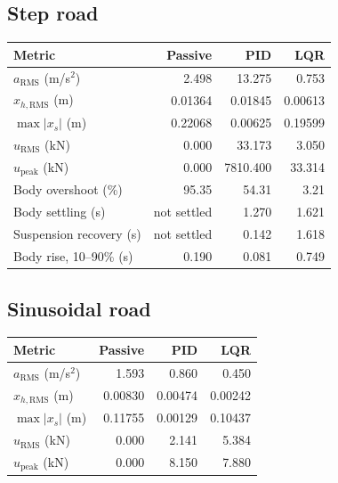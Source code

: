 \subsection*{Step road}
\begin{center}\begin{tabular}{lrrr}\toprule
Metric & Passive & PID & LQR\\\midrule
$a_{\mathrm{RMS}}$ (m/s$^2$) & 2.498 & 13.275 & 0.753\\
$x_{h,\mathrm{RMS}}$ (m) & 0.01364 & 0.01845 & 0.00613\\
$\max|x_s|$ (m) & 0.22068 & 0.00625 & 0.19599\\
$u_{\mathrm{RMS}}$ (kN) & 0.000 & 33.173 & 3.050\\
$u_{\mathrm{peak}}$ (kN) & 0.000 & 7810.400 & 33.314\\
Body overshoot (\%) & 95.35 & 54.31 & 3.21\\
Body settling (s) & not settled & 1.270 & 1.621\\
Suspension recovery (s) & not settled & 0.142 & 1.618\\
Body rise, 10--90\% (s) & 0.190 & 0.081 & 0.749\\
\bottomrule\end{tabular}\end{center}
\subsection*{Sinusoidal road}
\begin{center}\begin{tabular}{lrrr}\toprule
Metric & Passive & PID & LQR\\\midrule
$a_{\mathrm{RMS}}$ (m/s$^2$) & 1.593 & 0.860 & 0.450\\
$x_{h,\mathrm{RMS}}$ (m) & 0.00830 & 0.00474 & 0.00242\\
$\max|x_s|$ (m) & 0.11755 & 0.00129 & 0.10437\\
$u_{\mathrm{RMS}}$ (kN) & 0.000 & 2.141 & 5.384\\
$u_{\mathrm{peak}}$ (kN) & 0.000 & 8.150 & 7.880\\
\bottomrule\end{tabular}\end{center}
